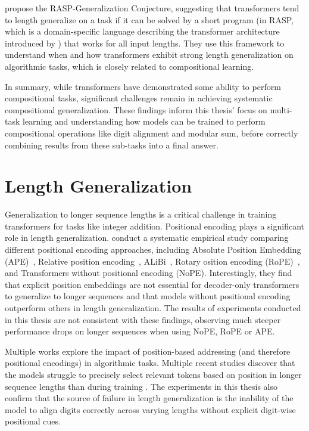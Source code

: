 \cite{zhou_what_2023} propose the RASP-Generalization Conjecture, suggesting that transformers tend to length generalize on a task if it can be solved by a short program (in RASP, which is a domain-specific language describing the transformer architecture introduced by \cite{weiss_thinking_2021}) that works for all input lengths. They use this framework to understand when and how transformers exhibit strong length generalization on algorithmic tasks, which is closely related to compositional learning.

In summary, while transformers have demonstrated some ability to perform compositional tasks, significant challenges remain in achieving systematic compositional generalization. These findings inform this thesis' focus on multi-task learning and understanding how models can be trained to perform compositional operations like digit alignment and modular sum, before correctly combining results from these sub-tasks into a final answer.

\section{Length Generalization}\label{sec:sota_length_generalization}

Generalization to longer sequence lengths is a critical challenge in training transformers for tasks like integer addition. Positional encoding plays a significant role in length generalization. \cite{kazemnejad_impact_2023} conduct a systematic empirical study comparing different positional encoding approaches, including Absolute Position Embedding (APE)~\parencite{vaswani_attention_2017}, Relative position encoding~\parencite{shaw_self-attention_2018}, ALiBi~\parencite{press_train_2021}, Rotary osition encoding (RoPE)~\parencite{su_roformer_2024}, and Transformers without positional encoding (NoPE). Interestingly, they find that explicit position embeddings are not essential for decoder-only transformers to generalize to longer sequences and that models without positional encoding outperform others in length generalization. The results of experiments conducted in this thesis are not consistent with these findings, observing much steeper performance drops on longer sequences when using NoPE, RoPE or APE.

Multiple works explore the impact of position-based addressing (and therefore positional encodings) in algorithmic tasks. Multiple recent studies discover that the models struggle to precisely select relevant tokens based on position in longer sequence lengths than during training \parencite{ebrahimi_your_2024,shen_positional_2023,zhao_length_2024,zhou_what_2023,yehudai_when_2024}. The experiments in this thesis also confirm that the source of failure in length generalization is the inability of the model to align digits correctly across varying lengths without explicit digit-wise positional cues.

